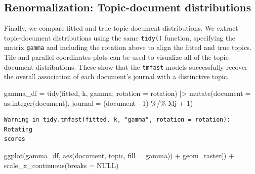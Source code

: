 \documentclass[
]{article}
\newenvironment{Shaded}{\begin{snugshade}}{\end{snugshade}}
\newcommand{\AttributeTok}[1]{\textcolor[rgb]{0.40,0.45,0.13}{#1}}
\newcommand{\ConstantTok}[1]{\textcolor[rgb]{0.56,0.35,0.01}{#1}}
\newcommand{\DecValTok}[1]{\textcolor[rgb]{0.68,0.00,0.00}{#1}}
\newcommand{\FunctionTok}[1]{\textcolor[rgb]{0.28,0.35,0.67}{#1}}
\newcommand{\NormalTok}[1]{\textcolor[rgb]{0.00,0.23,0.31}{#1}}
\newcommand{\OtherTok}[1]{\textcolor[rgb]{0.00,0.23,0.31}{#1}}
\newcommand{\SpecialCharTok}[1]{\textcolor[rgb]{0.37,0.37,0.37}{#1}}
\newcommand{\StringTok}[1]{\textcolor[rgb]{0.13,0.47,0.30}{#1}}
\begin{document}
\hypertarget{renormalization-topic-document-distributions}{%
\subsection{Renormalization: Topic-document
distributions}\label{renormalization-topic-document-distributions}}

Finally, we compare fitted and true topic-document distributions. We
extract topic-document distributions using the same \texttt{tidy()}
function, specifying the matrix \texttt{gamma} and including the
rotation above to align the fitted and true topics. Tile and parallel
coordinates plots can be used to visualize all of the topic-document
distributions. These show that the \texttt{tmfast} models successfully
recover the overall association of each document's journal with a
distinctive topic.

\begin{Shaded}
\begin{Highlighting}[]
\NormalTok{gamma\_df }\OtherTok{=} \FunctionTok{tidy}\NormalTok{(fitted, k, }\StringTok{\textquotesingle{}gamma\textquotesingle{}}\NormalTok{, }
                \AttributeTok{rotation =}\NormalTok{ rotation) }\SpecialCharTok{|\textgreater{}} 
    \FunctionTok{mutate}\NormalTok{(}\AttributeTok{document =} \FunctionTok{as.integer}\NormalTok{(document),}
           \AttributeTok{journal =}\NormalTok{ (document }\SpecialCharTok{{-}} \DecValTok{1}\NormalTok{) }\SpecialCharTok{\%/\%}\NormalTok{ Mj }\SpecialCharTok{+} \DecValTok{1}\NormalTok{)}
\end{Highlighting}
\end{Shaded}

\begin{verbatim}
Warning in tidy.tmfast(fitted, k, "gamma", rotation = rotation): Rotating
scores
\end{verbatim}

\begin{Shaded}
\begin{Highlighting}[]
\FunctionTok{ggplot}\NormalTok{(gamma\_df, }\FunctionTok{aes}\NormalTok{(document, topic, }\AttributeTok{fill =}\NormalTok{ gamma)) }\SpecialCharTok{+}
    \FunctionTok{geom\_raster}\NormalTok{() }\SpecialCharTok{+}
    \FunctionTok{scale\_x\_continuous}\NormalTok{(}\AttributeTok{breaks =} \ConstantTok{NULL}\NormalTok{)}
\end{Highlighting}
\end{Shaded}
\end{document}
